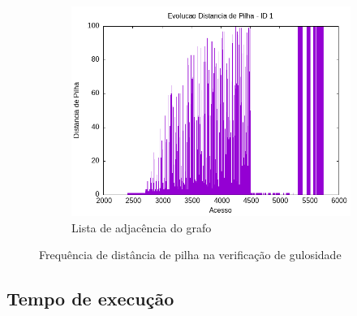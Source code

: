 \documentclass{article}
\begin{document}
\begin{figure}[H]
    \begin{subfigure}[c]{0.4\textwidth}
        \centering
        \includegraphics[width=\textwidth]{./images/100-200/my_sort/registro_a-distp-1.png}
        \caption{Lista de adjacência do grafo}
        \label{fig:ac05}
    \end{subfigure}
    \hfill
    \caption{Frequência de distância de pilha na verificação de gulosidade}

\end{figure}


            
            \subsection{Tempo de execução}
            
\end{document}
